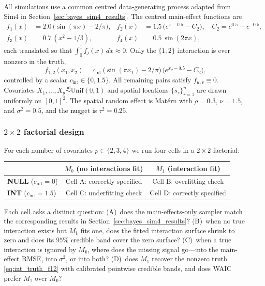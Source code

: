 All simulations use a common centred data-generating process adapted from Sim4 in
Section~\ref{sec:bayes_sim4_results}. The centred main-effect functions are
\begin{align*}
f_1(x)&=2.0\,\big(\sin(\pi x)-2/\pi\big), &
f_2(x)&=1.5\,\big(e^{x-0.5}-C_2\big),\quad C_2=e^{0.5}-e^{-0.5},\\
f_3(x)&=0.7\,(x^2-1/3), &
f_4(x)&=0.5\,\sin(2\pi x),
\end{align*}
each translated so that $\int_0^1 f_j(x)\,dx\approx 0$. Only the $\{1,2\}$ interaction is
ever nonzero in the truth,
\begin{equation}
f_{1,2}(x_1,x_2)=c_{\mathrm{int}}\,\big(\sin(\pi x_1)-2/\pi\big)\,\big(e^{x_2-0.5}-C_2\big),
\label{eq:int_truth_f12}
\end{equation}
controlled by a scalar $c_{\mathrm{int}}\in\{0,1.5\}$. All remaining pairs satisfy
$f_{u,v}\equiv 0$. Covariates $X_1,\ldots,X_p\overset{\mathrm{iid}}{\sim}\mathrm{Unif}(0,1)$
and spatial locations $\{s_r\}_{r=1}^n$ are drawn uniformly on $[0,1]^2$. The spatial
random effect is Mat\'ern with $\rho=0.3$, $\nu=1.5$, and $\sigma^2=0.5$, and the nugget is
$\tau^2=0.25$.

\subsubsection{$2\times 2$ factorial design}\label{sec:int_2x2}

For each number of covariates $p\in\{2,3,4\}$ we run four cells in a $2\times 2$ factorial:

\begin{center}
\small
\begin{tabular}{l|cc}
\toprule
 & $M_0$ (no interactions fit) & $M_1$ (interaction fit) \\
\midrule
\textbf{NULL} ($c_{\mathrm{int}}=0$) & Cell A: correctly specified     & Cell B: overfitting check \\
\textbf{INT}  ($c_{\mathrm{int}}=1.5$) & Cell C: underfitting check    & Cell D: correctly specified \\
\bottomrule
\end{tabular}
\end{center}

Each cell asks a distinct question:
(A)~does the main-effects-only sampler match the corresponding results in
Section~\ref{sec:bayes_sim4_results}?
(B)~when no true interaction exists but $M_1$ fits one, does the fitted interaction surface
shrink to zero and does its $95\%$ credible band cover the zero surface?
(C)~when a true interaction is ignored by $M_0$, where does the missing signal go---into
the main-effect RMSE, into $\sigma^2$, or into both?
(D)~does $M_1$ recover the nonzero truth \eqref{eq:int_truth_f12} with calibrated pointwise
credible bands, and does WAIC prefer $M_1$ over $M_0$?

